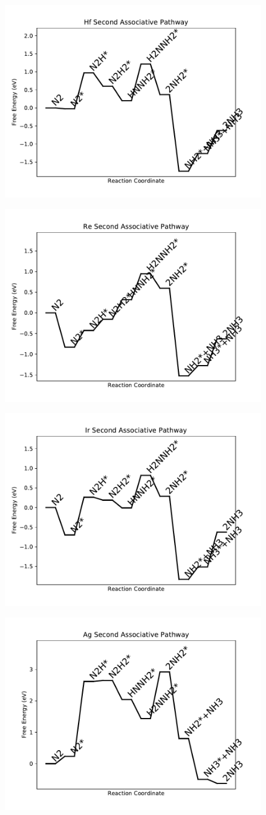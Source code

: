 \documentclass[journal=jacsat,manuscript=article]{achemso}
\begin{document}
\begin{figure}
\includegraphics[width=0.5\linewidth]{data/plots/Hf_associative_2.pdf}
\label{fig:Hf_associative_2}
\end{figure}

\begin{figure}
\includegraphics[width=0.5\linewidth]{data/plots/Re_associative_2.pdf}
\label{fig:Re_associative_2}
\end{figure}

\begin{figure}
\includegraphics[width=0.5\linewidth]{data/plots/Ir_associative_2.pdf}
\label{fig:Ir_associative_2}
\end{figure}

\begin{figure}
\includegraphics[width=0.5\linewidth]{data/plots/Ag_associative_2.pdf}
\label{fig:Ag_associative_2}
\end{figure}
\end{document}
